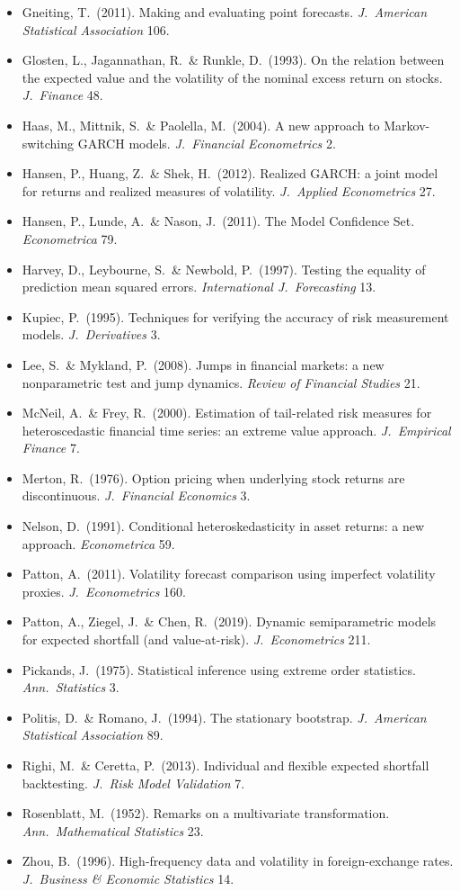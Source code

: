 \documentclass[11pt,a4paper]{article}
\begin{document}
{\begin{itemize}[nosep,leftmargin=*]
\item Gneiting, T.\ (2011). Making and evaluating point forecasts. \emph{J.\ American Statistical Association} 106.
\item Glosten, L., Jagannathan, R.\ \& Runkle, D.\ (1993). On the relation between the expected value and the volatility of the nominal excess return on stocks. \emph{J.\ Finance} 48.
\item Haas, M., Mittnik, S.\ \& Paolella, M.\ (2004). A new approach to Markov-switching GARCH models. \emph{J.\ Financial Econometrics} 2.
\item Hansen, P., Huang, Z.\ \& Shek, H.\ (2012). Realized GARCH: a joint model for returns and realized measures of volatility. \emph{J.\ Applied Econometrics} 27.
\item Hansen, P., Lunde, A.\ \& Nason, J.\ (2011). The Model Confidence Set. \emph{Econometrica} 79.
\item Harvey, D., Leybourne, S.\ \& Newbold, P.\ (1997). Testing the equality of prediction mean squared errors. \emph{International J.\ Forecasting} 13.
\item Kupiec, P.\ (1995). Techniques for verifying the accuracy of risk measurement models. \emph{J.\ Derivatives} 3.
\item Lee, S.\ \& Mykland, P.\ (2008). Jumps in financial markets: a new nonparametric test and jump dynamics. \emph{Review of Financial Studies} 21.
\item McNeil, A.\ \& Frey, R.\ (2000). Estimation of tail-related risk measures for heteroscedastic financial time series: an extreme value approach. \emph{J.\ Empirical Finance} 7.
\item Merton, R.\ (1976). Option pricing when underlying stock returns are discontinuous. \emph{J.\ Financial Economics} 3.
\item Nelson, D.\ (1991). Conditional heteroskedasticity in asset returns: a new approach. \emph{Econometrica} 59.
\item Patton, A.\ (2011). Volatility forecast comparison using imperfect volatility proxies. \emph{J.\ Econometrics} 160.
\item Patton, A., Ziegel, J.\ \& Chen, R.\ (2019). Dynamic semiparametric models for expected shortfall (and value-at-risk). \emph{J.\ Econometrics} 211.
\item Pickands, J.\ (1975). Statistical inference using extreme order statistics. \emph{Ann.\ Statistics} 3.
\item Politis, D.\ \& Romano, J.\ (1994). The stationary bootstrap. \emph{J.\ American Statistical Association} 89.
\item Righi, M.\ \& Ceretta, P.\ (2013). Individual and flexible expected shortfall backtesting. \emph{J.\ Risk Model Validation} 7.
\item Rosenblatt, M.\ (1952). Remarks on a multivariate transformation. \emph{Ann.\ Mathematical Statistics} 23.
\item Zhou, B.\ (1996). High-frequency data and volatility in foreign-exchange rates. \emph{J.\ Business \& Economic Statistics} 14.
\end{itemize}
}
\end{document}
